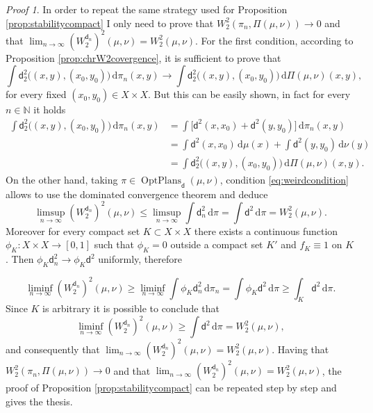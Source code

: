 \documentclass[11pt,twoside,a4paper]{article}
\newcommand{\setN}{\mathbb{N}}
\newcommand{\de}{\ensuremath{\, \mathrm d}} %
\newcommand{\thmsymbol}{\( \square \)}
\newcommand{\di}{\mathsf d} %
\DeclareMathOperator{\OptPlans}{OptPlans}
\theoremstyle{theorem}
\theoremstyle{definition}
\theoremstyle{remark}
\theoremstyle{proof}
\newtheorem*{pro}{Proof}
\newenvironment{pr}{\begin{pro}%
 \renewcommand{\qedsymbol}{\thmsymbol}\pushQED{\qed}}%
 {\popQED\end{pro}}
\begin{document}
\begin{pr}
In order to repeat the same strategy used for Proposition \ref{prop:stabilitycompact} I only need to prove that $W_2^2(\pi_n,\Pi(\mu,\nu))\to 0$ and that $\lim_{n \to \infty}(W_2^{\di_n})^2(\mu,\nu) = W_2^2(\mu,\nu)$. For the first condition, according to Proposition \ref{prop:chrW2covergence}, it is sufficient to prove that \begin{equation*}\int \di_2^2 \big((x,y),(x_0,y_0)\big) \de \pi_n (x,y) \to \int \di_2^2 \big((x,y),(x_0,y_0)\big) \de \Pi(\mu,\nu) (x,y),\end{equation*}for every fixed $(x_0,y_0)\in X\times X$. But this can be easily shown, in fact for every $n\in \setN$ it holds\begin{align*}    \int \di_2^2 \big((x,y),(x_0,y_0)\big) \de \pi_n (x,y) &= \int \big[ \di^2(x,x_0) + \di^2(y,y_0) \big] \de \pi_n (x,y) \\ &= \int \di^2(x,x_0) \de \mu (x) + \int \di^2(y,y_0) \de \nu (y)\\ &= \int \di_2^2 \big((x,y),(x_0,y_0)\big) \de \Pi(\mu,\nu) (x,y).\end{align*}
On the other hand, taking $\pi\in \OptPlans_\di(\mu,\nu)$, condition \eqref{eq:weirdcondition} allows to use the dominated convergence theorem and deduce
\begin{equation*}
    \limsup_{n \to \infty}(W_2^{\di_n})^2(\mu,\nu) \leq \limsup_{n \to \infty} \int \di_n^2 \de \pi = \int \di^2 \de \pi  = W_2^2(\mu,\nu).
\end{equation*}
Moreover for every compact set $K\subset X\times X$ there exists a continuous function $\phi_K:X\times X\to [0,1]$ such that $\phi_K=0$ outside a compact set $K'$ and $f_K\equiv 1$ on $K$. Then $\phi_K \di^2_n \to \phi_K \di^2$ uniformly, therefore

\begin{equation*}
    \liminf_{n \to \infty}(W_2^{\di_n})^2(\mu,\nu) \geq \liminf_{n \to \infty}\int \phi_K \di_n^2 \de \pi_n = \int \phi_K \di^2 \de \pi \geq \int_K \di^2 \de \pi.
\end{equation*}
Since $K$ is arbitrary it is possible to conclude that 
\begin{equation*}
    \liminf_{n \to \infty}(W_2^{\di_n})^2(\mu,\nu) \geq  \int \di^2 \de \pi = W_2^2(\mu,\nu),
\end{equation*}
and consequently that $\lim_{n \to \infty}(W_2^{\di_n})^2(\mu,\nu) = W_2^2(\mu,\nu)$.
Having that $W_2^2(\pi_n,\Pi(\mu,\nu))\to 0$ and that $\lim_{n \to \infty}(W_2^{\di_n})^2(\mu,\nu) = W_2^2(\mu,\nu)$, the proof of Proposition \ref{prop:stabilitycompact} can be repeated step by step and gives the thesis.
\end{pr}
\end{document}
